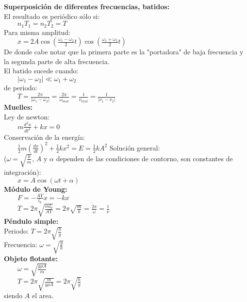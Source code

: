 \documentclass[a4paper,landscape,10pt]{cheatsheet}
\begin{document}
\textbf{Superposición de diferentes frecuencias, batidos:}\\
El resultado es periódico sólo si:\\
$\qquad n_1T_1=n_2T_2=T$\\
Para misma amplitud:\\
$\qquad x=2A \cos\left(\frac{\omega_1-\omega_2}{2}t\right) \cos\left(\frac{\omega_1+\omega_2}{2}t\right)$\\
De donde cabe notar que la primera parte es la "portadora" de baja frecuencia y la segunda parte de alta frecuencia.\\
El batido sucede cuando:\\
$\qquad\lvert\omega_1-\omega_2\rvert\ll\omega_1+\omega_2$\\
de periodo:\\
$\qquad T=\frac{2\pi}{\lvert\omega_1-\omega_2\lvert}=\frac{2\pi}{\omega_{\text{beat}}}=\frac{1}{\nu_{\text{beat}}}=\frac{1}{\lvert \nu_1-\nu_2\rvert}$
\\
\textbf{Muelles:}\\
Ley de newton:\\
$\qquad m\frac{d^2x}{dt^2}+kx=0$\\
Conservación de la energía:\\
$\qquad\frac{1}{2}m\left(\frac{dx}{dt}\right)^2 + \frac{1}{2}kx^2 = E = \frac{1}{2}kA^2$
Solución general:\\
($\omega=\sqrt{\frac{k}{m}}$, $A$ y $\alpha$ dependen de las condiciones de contorno, son constantes de integración):\\
$\qquad x=A\cos\left(\omega t+\alpha\right)$\\
\textbf{Módulo de Young:}\\
$\qquad F=-\frac{AY}{l_0}x = -kx$\\
$\qquad T=2\pi\sqrt{\frac{ml_0}{AY}}=2\pi\sqrt{\frac{m}{k}}=\frac{2\pi}{\omega}=\frac{1}{\nu}$\\
\textbf{Péndulo simple:}\\
Periodo: $T=2\pi\sqrt{\frac{h}{g}}$\\
Frecuencia: $\omega=\sqrt{\frac{g}{h}}$\\
\textbf{Objeto flotante:}\\
$\qquad\omega=\sqrt{\frac{g\rho A}{m}}$\\
$\qquad T=2\pi\sqrt{\frac{m}{g\rho A}}=2\pi\sqrt{\frac{h}{g}}$\\
siendo $A$ el area.


\end{document}
